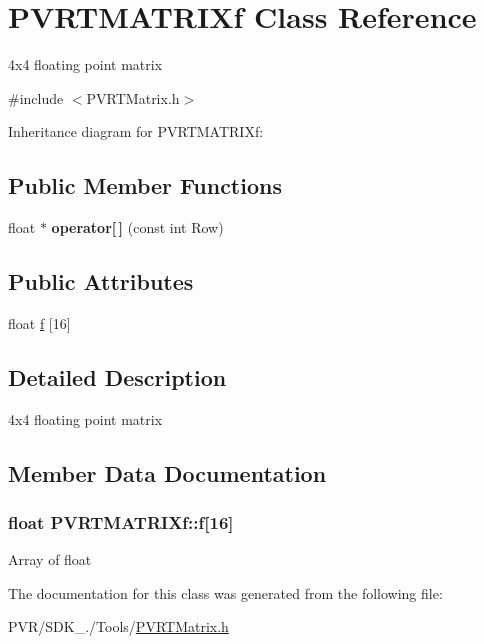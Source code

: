 \hypertarget{class_p_v_r_t_m_a_t_r_i_xf}{\section{P\+V\+R\+T\+M\+A\+T\+R\+I\+Xf Class Reference}
\label{class_p_v_r_t_m_a_t_r_i_xf}
}


4x4 floating point matrix  




{\ttfamily \#include $<$P\+V\+R\+T\+Matrix.\+h$>$}



Inheritance diagram for P\+V\+R\+T\+M\+A\+T\+R\+I\+Xf\+:
\subsection*{Public Member Functions}
\begin{DoxyCompactItemize}
\item 
\hypertarget{class_p_v_r_t_m_a_t_r_i_xf_a86106c28aee3243d2a8a5ef5030e3a53}{float $\ast$ {\bfseries operator\mbox{[}$\,$\mbox{]}} (const int Row)}\label{class_p_v_r_t_m_a_t_r_i_xf_a86106c28aee3243d2a8a5ef5030e3a53}

\end{DoxyCompactItemize}
\subsection*{Public Attributes}
\begin{DoxyCompactItemize}
\item 
float \hyperlink{class_p_v_r_t_m_a_t_r_i_xf_ae5886dec268d81c4a98add18785b968e}{f} \mbox{[}16\mbox{]}
\end{DoxyCompactItemize}


\subsection{Detailed Description}
4x4 floating point matrix 



 

\subsection{Member Data Documentation}
\hypertarget{class_p_v_r_t_m_a_t_r_i_xf_ae5886dec268d81c4a98add18785b968e}{
\subsubsection[{f}]{\setlength{\rightskip}{0pt plus 5cm}float P\+V\+R\+T\+M\+A\+T\+R\+I\+Xf\+::f\mbox{[}16\mbox{]}}}\label{class_p_v_r_t_m_a_t_r_i_xf_ae5886dec268d81c4a98add18785b968e}
Array of float 

The documentation for this class was generated from the following file\+:\begin{DoxyCompactItemize}
\item 
P\+V\+R/\+S\+D\+K\+\_./\+Tools/\hyperlink{_p_v_r_t_matrix_8h}{P\+V\+R\+T\+Matrix.\+h}\end{DoxyCompactItemize}
